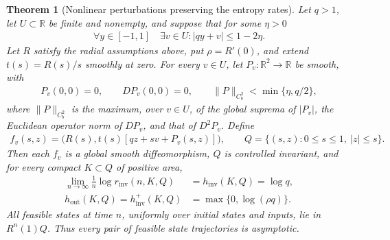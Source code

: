 \documentclass[11pt,a4paper]{article}
\newtheorem{theorem}{Theorem}[section]
\theoremstyle{definition}
\theoremstyle{remark}
\begin{document}
\begin{theorem}[Nonlinear perturbations preserving the entropy rates]\label{thm:nonlinear}
Let \(q>1\), let \(U\subset\mathbb R\) be finite and nonempty, and suppose that for some \(\eta>0\)
\begin{align}\label{eq:nonlinear-margin}
 \forall y\in[-1,1]\quad\exists v\in U:
       |qy+v|\leq1-2\eta.
\end{align}
Let \(R\) satisfy the radial assumptions above, put \(\rho=R'(0)\), and extend \(t(s)=R(s)/s\) smoothly at zero. For every \(v\in U\), let \(P_v:\mathbb R^2\to\mathbb R\) be smooth, with
\begin{align}\label{eq:zero-jet}
 P_v(0,0)=0,\qquad DP_v(0,0)=0,\qquad
 \|P\|_{C_b^2}<\min\{\eta,q/2\},
\end{align}
where \(\|P\|_{C_b^2}\) is the maximum, over \(v\in U\), of the global suprema of \(|P_v|\), the Euclidean operator norm of \(DP_v\), and that of \(D^2P_v\). Define
\begin{align}\label{eq:nonlinear-system}
 f_v(s,z)=\bigl(R(s),t(s)[qz+sv+P_v(s,z)]\bigr),
 \qquad Q=\{(s,z):0\leq s\leq1,\ |z|\leq s\}.
\end{align}
Then each \(f_v\) is a global smooth diffeomorphism, \(Q\) is controlled invariant, and for every compact \(K\subset Q\) of positive area,
\begin{align}\label{eq:nonlinear-entropies}
 \lim_{n\to\infty}\frac1n\log r_{\mathrm{inv}}(n,K,Q)
 &=h_{\mathrm{inv}}(K,Q)=\log q,\\
 h_{\mathrm{out}}(K,Q)=h_{\mathrm{inv}}^+(K,Q)
 &=\max\{0,\log(\rho q)\}.
\end{align}
All feasible states at time \(n\), uniformly over initial states and inputs, lie in \(R^n(1)Q\). Thus every pair of feasible state trajectories is asymptotic.
\end{theorem}
\end{document}
